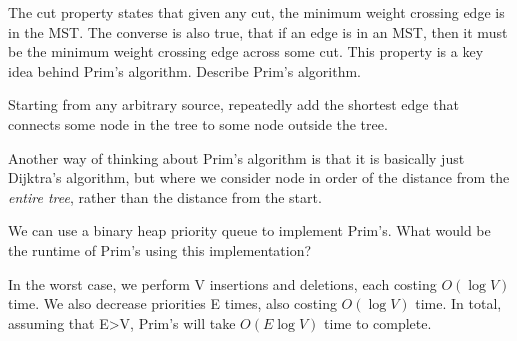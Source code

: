 \begin{blocksection}
The cut property states that given any cut, the minimum weight crossing edge is in the MST. The converse is also true, that if an edge is in an MST, then it must be the minimum weight crossing edge across some cut. This property is a key idea behind Prim's algorithm.
\question Describe Prim's algorithm.

\begin{solution}[0.5in]
Starting from any arbitrary source, repeatedly add the shortest edge that
connects some node in the tree to some node outside the tree.

Another way of thinking about Prim's algorithm is that it is basically just
Dijktra's algorithm, but where we consider node in order of the distance from the
\emph{entire tree}, rather than the distance from the start.
\end{solution}

\question We can use a binary heap priority queue to implement Prim's. What would be the runtime of Prim's using this implementation?  
\begin{solution}[0.75in]
In the worst case, we perform V insertions and deletions, each costing $O(\log V)$ time. We also decrease priorities E times, also costing $O(\log V)$ time. In total, assuming that E\textgreater  V, Prim's will take $O(E \log V)$ time to complete.

\end{solution}
\end{blocksection}